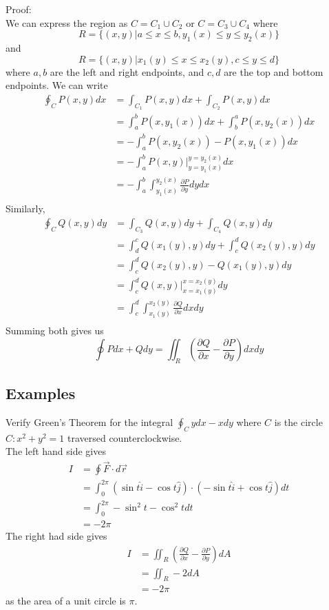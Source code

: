 \documentclass[12pt]{article}
\begin{document}
Proof: \\
We can express the region as $C = C_1 \cup C_2$ or $C = C_3 \cup C_4$ where
$$R = \{(x,y)| a \leq x \leq b, y_1(x) \leq y \leq y_2(x)\}$$
and
$$R = \{(x,y)| x_1(y) \leq x \leq x_2(y), c \leq y \leq d\}$$
where $a, b$ are the left and right endpoints, and $c, d$ are the top and bottom endpoints. We can write
\begin{align*}
	\oint_C P(x,y)dx &= \int_{C_1}P(x,y)dx + \int_{C_2}P(x,y)dx \\
			 &= \int_a^bP(x,y_1(x))dx + \int_b^aP(x,y_2(x))dx \\
			 &= -\int_a^bP(x,y_2(x))-P(x,y_1(x))dx \\
			 &= -\int_a^b P(x,y) \Big |_{y=y_1(x)}^{y=y_2(x)}dx \\
			 &= -\int_a^b \int_{y_1(x)}^{y_2(x)} \frac{\partial P}{\partial y} dydx \\
\end{align*}
Similarly,
\begin{align*}
	\oint_C Q(x,y)dy &= \int_{C_3}Q(x,y)dy + \int_{C_4}Q(x,y)dy \\
			 &= \int_d^cQ(x_1(y),y)dy + \int_c^dQ(x_2(y),y)dy \\
			 &= \int_c^d Q(x_2(y),y) - Q(x_1(y),y)dy \\
			 &= \int_c^d Q(x,y) \Big |_{x=x_1(y)}^{x=x_2(y)} dy \\
			 &= \int_c^d \int_{x_1(y)}^{x_2(y)} \frac{\partial Q}{\partial x} dxdy \\
\end{align*}
Summing both gives us
$$\oint Pdx + Qdy = \iint_R \left(\frac{\partial Q}{\partial x} - \frac{\partial P}{\partial y}\right) dxdy$$

\subsection{Examples}

\begin{ex}
	Verify Green's Theorem for the integral $\oint_Cydx - xdy$ where $C$ is the circle $C:x^2+y^2=1$ traversed counterclockwise. \\
	The left hand side gives
	\begin{align*}
		I &= \oint \vec{F} \cdot d\vec{r} \\
		  &= \int_0^{2\pi} (\sin t\hat{i}-\cos t\hat{j})\cdot(-\sin t\hat{i}+\cos t\hat{j})dt \\
		  &= \int_0^{2\pi} -\sin^2 t - \cos^2 t dt \\
		  &= -2\pi
	\end{align*}
	The right had side gives
	\begin{align*}
		I &= \iint_R\left(\frac{\partial Q}{\partial x} - \frac{\partial P}{\partial y}\right) dA \\
		  &= \iint_R -2dA \\
		  &= -2\pi
	\end{align*}
	as the area of a unit circle is $\pi$. 
\end{ex}
\end{document}
